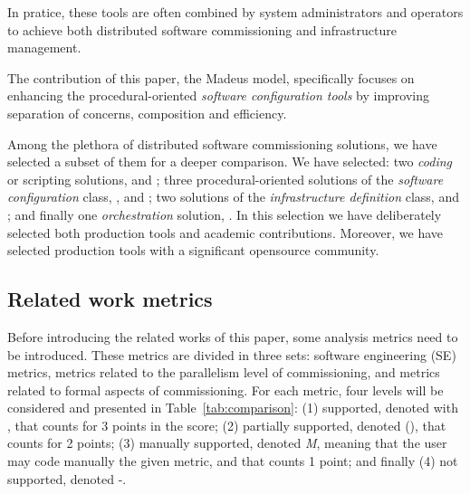 In pratice, these tools are often combined by system administrators
and operators to achieve both distributed software commissioning and
infrastructure management.

\begin{tcolorbox}[enhanced,attach boxed title to top left={yshift=-3mm,yshifttext=-1mm},
  colback=black!5!white,colframe=black!30,colbacktitle=black!60,
  title=Contribution,fonttitle=\bfseries,
  boxed title style={size=small,colframe=black!60,boxrule=0.2mm},
  boxrule=0.2mm]
  The contribution of this paper, \ie the Madeus model, specifically
  focuses on enhancing the procedural-oriented \emph{software
    configuration tools} by improving separation of concerns,
  composition and efficiency.
\end{tcolorbox}

Among the plethora of distributed software commissioning solutions, we
have selected a subset of them for a deeper comparison. We have
selected: two \emph{coding} or scripting solutions, \shell and
\fractal; three procedural-oriented solutions of the \emph{software
  configuration} class, \ansible, \deployware and \aeolus; two
solutions of the \emph{infrastructure definition} class, \juju and
\tosca; and finally one \emph{orchestration} solution, \kubernetes. In
this selection we have deliberately selected both production tools and
academic contributions. Moreover, we have selected production tools
with a significant opensource community.

\subsection{Related work metrics}

Before introducing the related works of this paper, some analysis
metrics need to be introduced. These metrics are divided in three
sets: software engineering (SE) metrics, metrics related to the
parallelism level of commissioning, and metrics related to formal
aspects of commissioning. For each metric, four levels will be
considered and presented in Table~\ref{tab:comparison}: (1) supported,
denoted with \checkmark, that counts for 3 points in the score; (2)
partially supported, denoted (\checkmark), that counts for 2 points;
(3) manually supported, denoted \emph{M}, meaning that the user may
code manually the given metric, and that counts 1 point; and finally
(4) not supported, denoted -.

